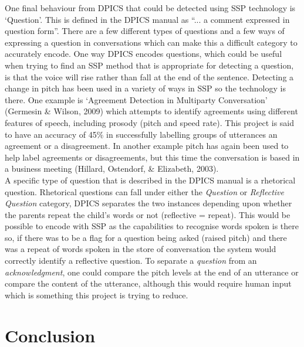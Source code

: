 \documentclass[a4paper,11pt]{report}
\begin{document}
One final behaviour from DPICS that could be detected using SSP technology is ‘Question’. This is defined in the DPICS manual as “... a comment expressed in question form”. There are a few different types of questions and a few ways of expressing a question in conversations which can make this a difficult category to accurately encode. One way DPICS encodes questions, which could be useful when trying to find an SSP method that is appropriate for detecting a question, is that the voice will rise rather than fall at the end of the sentence. Detecting a change in pitch has been used in a variety of ways in SSP so the technology is there. One example is ‘Agreement Detection in Multiparty Conversation’ (Germesin \& Wilson, 2009) which attempts to identify agreements using different features of speech, including prosody (pitch and speed rate). This project is said to have an accuracy of 45\% in successfully labelling groups of utterances an agreement or a disagreement. In another example pitch has again been used to help label agreements or disagreements, but this time the conversation is based in a business meeting (Hillard, Ostendorf, \& Elizabeth, 2003).\\

A specific type of question that is described in the DPICS manual is a rhetorical question. Rhetorical questions can fall under either the \textit{Question} or \textit{Reflective Question} category, DPICS separates the two instances depending upon whether the parents repeat the child’s words or not (reflective = repeat). This would be possible to encode with SSP as the capabilities to recognise words spoken is there so, if there was to be a flag for a question being asked (raised pitch) and there was a repeat of words spoken in the store of conversation the system would correctly identify a reflective question. To separate a \textit{question} from an \textit{acknowledgment}, one could compare the pitch levels at the end of an utterance or compare the content of the utterance, although this would require human input which is something this project is trying to reduce.

\chapter{Conclusion}
\end{document}
